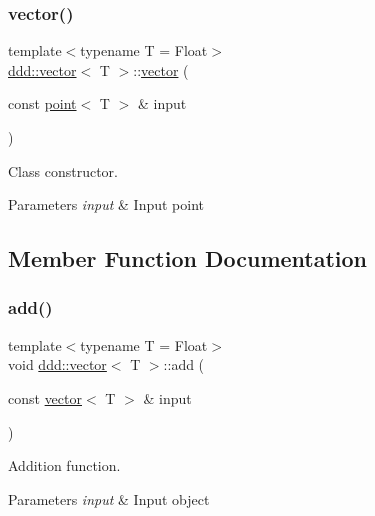 \subsubsection{\texorpdfstring{vector()}{vector()}\hspace{0.1cm}{\footnotesize\ttfamily [3/3]}}
{\footnotesize\ttfamily template$<$typename T = Float$>$ \\
\hyperlink{classddd_1_1vector}{ddd\+::vector}$<$ T $>$\+::\hyperlink{classddd_1_1vector}{vector} (\begin{DoxyParamCaption}\item[{const \hyperlink{classddd_1_1point}{point}$<$ T $>$ \&}]{input }\end{DoxyParamCaption})\hspace{0.3cm}{\ttfamily [inline]}}



Class constructor. 


\begin{DoxyParams}{Parameters}
{\em input} & Input point \\
\hline
\end{DoxyParams}


\subsection{Member Function Documentation}
\mbox{\label{classddd_1_1vector_a97eca6a6625002022ab2442b5cbd0462}} 
\subsubsection{\texorpdfstring{add()}{add()}}
{\footnotesize\ttfamily template$<$typename T = Float$>$ \\
void \hyperlink{classddd_1_1vector}{ddd\+::vector}$<$ T $>$\+::add (\begin{DoxyParamCaption}\item[{const \hyperlink{classddd_1_1vector}{vector}$<$ T $>$ \&}]{input }\end{DoxyParamCaption})\hspace{0.3cm}{\ttfamily [inline]}}



Addition function. 


\begin{DoxyParams}{Parameters}
{\em input} & Input object \\
\hline
\end{DoxyParams}
\mbox{\label{classddd_1_1vector_ad1a37ce1d1c20c227257fd1fd223c3cf}} 
